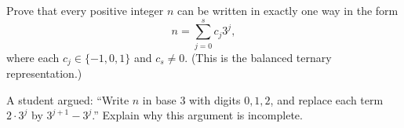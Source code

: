 Prove that every positive integer $n$ can be written in exactly one way in the form
\[n=\sum_{j=0}^{s}c_j3^j,\]
where each $c_j\in\{-1,0,1\}$ and $c_s\ne0$. (This is the balanced ternary representation.)

A student argued: ``Write $n$ in base $3$ with digits $0,1,2$, and replace each term $2\cdot3^j$ by $3^{j+1}-3^j$.'' Explain why this argument is incomplete.
